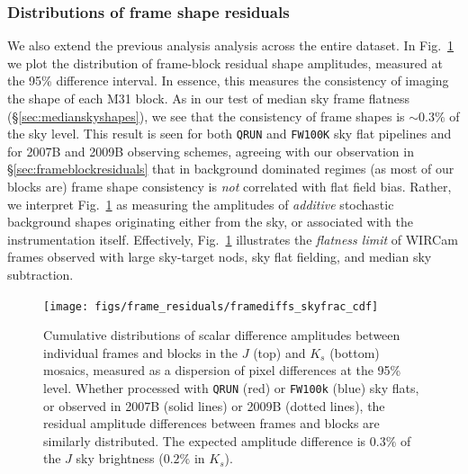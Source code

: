 \documentclass[iop]{emulateapj}
\newcommand{\mycomment}[1]{\textcolor{OliveGreen}{\textit{#1}}} %
\newcommand{\Fig}[1]{Fig.~\ref{fig:#1}}  %
\newcommand{\Sec}[1]{\S\ref{sec:#1}}  %
\begin{document}
\subsubsection{Distributions of frame shape residuals}
\label{sec:frameblockresidualhist}

We also extend the previous analysis analysis across the entire dataset.
In \Fig{frame_diffs_skyfrac} we plot the distribution of frame-block residual shape amplitudes, measured at the 95\% difference interval.
In essence, this measures the consistency of imaging the shape of each M31 block.
As in our test of median sky frame flatness (\Sec{medianskyshapes}), we see that the consistency of frame shapes is $\sim 0.3\%$ of the sky level.
This result is seen for both \texttt{QRUN} and \texttt{FW100K} sky flat pipelines and for 2007B and 2009B observing schemes, agreeing with our observation in \Sec{frameblockresiduals} that in background dominated regimes (as most of our blocks are) frame shape consistency is \emph{not} correlated with flat field bias.
Rather, we interpret \Fig{frame_diffs_skyfrac} as measuring the amplitudes of \emph{additive} stochastic background shapes originating either from the sky, or associated with the instrumentation itself.
Effectively, \Fig{frame_diffs_skyfrac} illustrates the \emph{flatness limit} of WIRCam frames observed with large sky-target nods, sky flat fielding, and median sky subtraction.

\begin{figure}[t]
\centering
\texttt{[image: figs/frame\_residuals/framediffs\_skyfrac\_cdf]}
\caption{Cumulative distributions of scalar difference amplitudes between individual frames and blocks in the $J$ (top) and $K_s$ (bottom) mosaics, measured as a dispersion of pixel differences at the 95\% level.
Whether processed with \texttt{QRUN} (red) or \texttt{FW100k} (blue) sky flats, or observed in 2007B (solid lines) or 2009B (dotted lines), the residual amplitude differences between frames and blocks are similarly distributed.
The expected amplitude difference is $0.3\%$ of the $J$ sky brightness ($0.2\%$ in $K_s$).
}
\label{fig:frame_diffs_skyfrac}
\end{figure}

\end{document}

